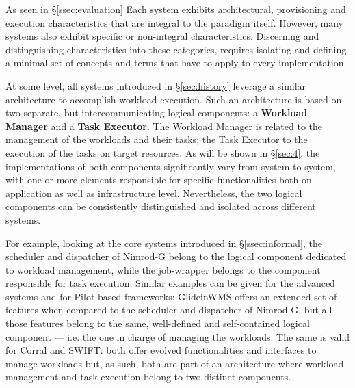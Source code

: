 \documentclass{sig-alternate}
\begin{document}
As seen in \S\ref{ssec:evaluation}
Each \pilotjob system exhibits architectural, provisioning and execution
characteristics that are integral to the \pilotjob paradigm itself.
However, many \pilotjob systems also exhibit specific or non-integral
characteristics. Discerning and distinguishing characteristics into these
categories, requires isolating and defining a minimal set of concepts and terms
that have to apply to every \pilotjob implementation.

At some level, all \pilotjob systems introduced in \S\ref{sec:history} leverage
a similar architecture to accomplish workload execution. Such an architecture
is based on two separate, but intercommunicating logical components: a \textbf{ Workload
Manager} and a \textbf{Task Executor}. The Workload Manager is related to the
management of the workloads and their tasks; the Task Executor to the execution
of the tasks on target resources. As will be shown in \S\ref{sec:4}, the
implementations of both components significantly vary from system to system,
with one or more elements responsible for specific functionalities both on
application as well as infrastructure level. Nevertheless, the two logical
components can be consistently distinguished and isolated across different
\pilotjob systems.

For example, looking at the core \pilotjob systems introduced in
\S\ref{ssec:informal}, the scheduler and dispatcher of Nimrod-G belong to the
logical component dedicated to workload management, while the job-wrapper
belongs to the component responsible for task execution. Similar
examples can be given for the advanced \pilotjob systems and for Pilot-based
frameworks: GlideinWMS offers an extended set of features when compared to the
scheduler and dispatcher of Nimrod-G, but all those features belong to the
same, well-defined and self-contained logical component --- i.e. the one
in charge of managing the workloads. The same is valid for Corral and SWIFT:
both offer evolved functionalities and interfaces to manage workloads
but, as such, both are part of an architecture where workload management
and task execution belong to two distinct components.
\end{document}
